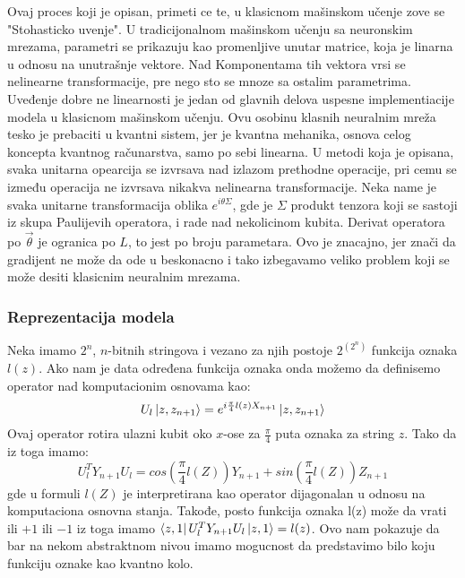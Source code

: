 \documentclass[12pt, letterpaper, oneside]{article}
\begin{document}
Ovaj proces koji je opisan, primeti ce te, u klasicnom mašinskom učenje zove se "Stohasticko uvenje".
U tradicijonalnom mašinskom učenju sa neuronskim mrezama, parametri se prikazuju kao promenljive unutar matrice, koja 
je linarna u odnosu na unutrašnje vektore. Nad Komponentama tih vektora vrsi se nelinearne transformacije, pre nego sto se mnoze sa
ostalim parametrima. Uveđenje dobre ne linearnosti je jedan od glavnih delova uspesne implementiacije modela u klasicnom mašinskom učenju.
Ovu osobinu klasnih neuralnim mreža tesko je prebaciti u kvantni sistem, jer je kvantna mehanika, osnova celog koncepta kvantnog računarstva, samo po sebi linearna.
U metodi koja je opisana, svaka unitarna opearcija se izvrsava nad izlazom prethodne operacije, pri cemu se između operacija ne izvrsava nikakva nelinearna transformacije.
Neka name je svaka unitarne transformacija oblika $e^{i\theta\Sigma}$, gde je $\Sigma$ produkt tenzora koji se sastoji iz skupa Paulijevih operatora, i rade nad nekolicinom kubita.
Derivat operatora po $\overrightarrow{\theta}$ je ogranica po $L$, to jest po broju parametara.
Ovo je znacajno, jer znači da gradijent ne može da ode u beskonacno i tako izbegavamo veliko problem koji se može desiti klasicnim neuralnim mrezama.

\subsubsection{Reprezentacija modela}
Neka imamo $2^n$, $n$-bitnih stringova i vezano za njih postoje $2^{(2^n)}$ funkcija oznaka $l(z)$.
Ako nam je data određena funkcija oznaka onda možemo da definisemo operator nad komputacionim osnovama kao:
\[
    U_l\Ket{z,z_{n+1}} = e^{i\frac{\pi}{4}l(z)X_{n+1}}\Ket{z,z_{n+1}}
\]
Ovaj operator rotira ulazni kubit oko $x$-ose za $\frac{\pi}{4}$ puta oznaka za string $z$.
Tako da iz toga imamo:
\[
    U_l^TY_{n+1}U_l = cos(\frac{\pi}{4}l(Z))Y_{n+1} + sin(\frac{\pi}{4}l(Z))Z_{n+1}
\]
gde u formuli $l(Z)$ je interpretirana kao operator dijagonalan u odnosu na komputaciona osnovna stanja.
Takođe, posto funkcija oznaka l(z) može da vrati ili $+1$ ili $-1$ iz toga imamo $\bra{z,1}U_l^TY_{n+1}U_l\ket{z,1} = l(z)$.
Ovo nam pokazuje da bar na nekom abstraktnom nivou imamo mogucnost da predstavimo bilo koju funkciju oznake kao kvantno kolo.
\end{document}
